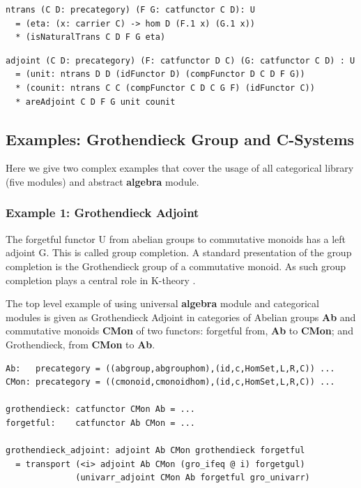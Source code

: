 \documentclass{article}
\begin{document}
\begin{lstlisting}[mathescape=true]
ntrans (C D: precategory) (F G: catfunctor C D): U
  = (eta: (x: carrier C) -> hom D (F.1 x) (G.1 x))
  * (isNaturalTrans C D F G eta)
\end{lstlisting}

\begin{lstlisting}[mathescape=true]
adjoint (C D: precategory) (F: catfunctor D C) (G: catfunctor C D) : U
  = (unit: ntrans D D (idFunctor D) (compFunctor D C D F G))
  * (counit: ntrans C C (compFunctor C D C G F) (idFunctor C))
  * areAdjoint C D F G unit counit
\end{lstlisting}

\subsection{Examples: Grothendieck Group and C-Systems}

Here we give two complex examples that cover the usage of all categorical library (five modules)
and abstract {\bf algebra} module.

\subsubsection*{Example 1: Grothendieck Adjoint}

The forgetful functor U from abelian groups to commutative
monoids has a left adjoint G. This is called group completion.
A standard presentation of the group completion is the Grothendieck group
of a commutative monoid. As such group completion plays a central
role in K-theory \cite{Weibel13}.

The top level example of using universal {\bf algebra} module and categorical modules
is given as Grothendieck Adjoint in categories of Abelian groups {\bf Ab} and
commutative monoids {\bf CMon} of two functors: forgetful from, {\bf Ab} to {\bf CMon}; and
Grothendieck, from {\bf CMon} to {\bf Ab}.

\begin{lstlisting}[mathescape=true]
Ab:   precategory = ((abgroup,abgrouphom),(id,c,HomSet,L,R,C)) ...
CMon: precategory = ((cmonoid,cmonoidhom),(id,c,HomSet,L,R,C)) ...

grothendieck: catfunctor CMon Ab = ...
forgetful:    catfunctor Ab CMon = ...

grothendieck_adjoint: adjoint Ab CMon grothendieck forgetful
  = transport (<i> adjoint Ab CMon (gro_ifeq @ i) forgetgul)
              (univarr_adjoint CMon Ab forgetful gro_univarr)
\end{lstlisting}
\end{document}
